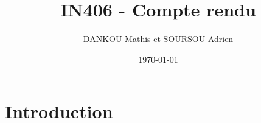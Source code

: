 \documentclass{article}
\title{IN406 - Compte rendu}
\author{DANKOU Mathis et SOURSOU Adrien}
\date{\today}
\begin{document}
\maketitle

\section{Introduction}
\end{document}
